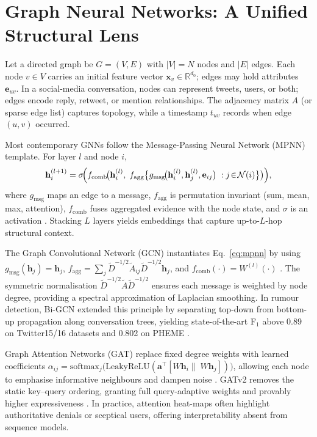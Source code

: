 \documentclass{cshonours}
\begin{document}
\section{Graph Neural Networks: A Unified Structural Lens}


Let a directed graph be \(G=(V,E)\) with \(|V|=N\) nodes and \(|E|\) edges.  Each node \(v\in V\) carries an initial feature vector \(\mathbf{x}_v\in\mathbb{R}^{d_0}\); edges may hold attributes \(\mathbf{e}_{uv}\).  In a social-media conversation, nodes can represent tweets, users, or both; edges encode reply, retweet, or mention relationships.  The adjacency matrix \(A\) (or sparse edge list) captures topology, while a timestamp \(t_{uv}\) records when edge \((u,v)\) occurred.


Most contemporary GNNs follow the Message-Passing Neural Network (MPNN) template.  For layer \(l\) and node \(i\),
\begin{equation}
\mathbf{h}_i^{(l+1)}
=\sigma\!\Bigl(
f_{\text{comb}}\!\bigl(
\mathbf{h}_i^{(l)},\;
f_{\text{agg}}\bigl\{
g_{\text{msg}}\!\bigl(
\mathbf{h}_i^{(l)},\mathbf{h}_j^{(l)},\mathbf{e}_{ij}\bigr)
\; : j\!\in\!\mathcal{N}(i)\bigr\}\bigr)
\Bigr),
\label{eq:mpnn}
\end{equation}
where  
\(g_{\text{msg}}\) maps an edge to a message,  
\(f_{\text{agg}}\) is permutation invariant (sum, mean, max, attention),  
\(f_{\text{comb}}\) fuses aggregated evidence with the node state,  
and \(\sigma\) is an activation \cite{gnn_applications_2024}.  
Stacking \(L\) layers yields embeddings that capture up-to-\(L\)-hop structural context.


The Graph Convolutional Network (GCN) instantiates Eq.~\eqref{eq:mpnn} by using  
\(g_{\text{msg}}(\mathbf{h}_j)=\mathbf{h}_j\),  
\(f_{\text{agg}}=\textstyle\sum\nolimits_{j}\tilde{D}^{-1/2}\tilde{A}_{ij}\tilde{D}^{-1/2}\mathbf{h}_j\),  
and \(f_{\text{comb}}(\cdot)=W^{(l)}(\cdot)\) \cite{kipf2017semi}.  
The symmetric normalisation \(\tilde{D}^{-1/2}\tilde{A}\tilde{D}^{-1/2}\) ensures each message is weighted by node degree, providing a spectral approximation of Laplacian smoothing.  In rumour detection, Bi-GCN extended this principle by separating top-down from bottom-up propagation along conversation trees, yielding state-of-the-art F\(_1\) above 0.89 on Twitter15/16 datasets and 0.802 on PHEME \cite{bian2020rumor}.


Graph Attention Networks (GAT) replace fixed degree weights with learned coefficients  
\(\alpha_{ij}=\text{softmax}_j\bigl(\text{LeakyReLU}(\mathbf{a}^\top[W\mathbf{h}_i\|\;W\mathbf{h}_j])\bigr)\),  
allowing each node to emphasise informative neighbours and dampen noise \cite{velickovic2018gat}.  GATv2 removes the static key–query ordering, granting full query-adaptive weights and provably higher expressiveness \cite{brody2022gatv2}.  In practice, attention heat-maps often highlight authoritative denials or sceptical users, offering interpretability absent from sequence models.
\end{document}
